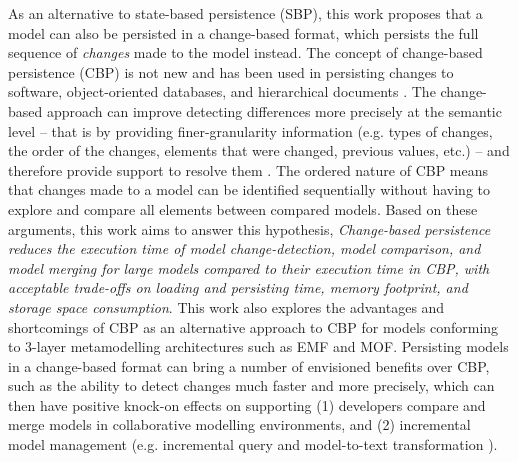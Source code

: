 \documentclass[sigplan,review,anonymous]{acmart}\settopmatter{printfolios=true,printccs=false,printacmref=false}
\begin{document}
As an alternative to state-based persistence (SBP), this work proposes that a model can also be persisted in a change-based format, which persists the full sequence of \emph{changes} made to the model instead. The concept of change-based persistence (CBP) is not new and has been used in persisting changes to software, object-oriented databases, and hierarchical documents \cite{DBLP:journals/entcs/RobbesL07,DBLP:conf/sde/LippeO92,DBLP:conf/caise/IgnatN05}. The change-based approach can improve detecting differences more precisely at the semantic level -- that is by providing finer-granularity information (e.g. types of changes, the order of the changes, elements that were changed, previous values, etc.) -- and therefore provide support to resolve them \cite{mens2002state}. The ordered nature of CBP means that changes made to a model can be identified sequentially without having to explore and compare all elements between compared models. Based on these arguments, this work aims to answer this hypothesis, \textit{Change-based persistence reduces the execution time of model change-detection, model comparison, and model merging for large models compared to their execution time in CBP, with acceptable trade-offs on loading and persisting time, memory footprint, and storage space consumption}. This work also explores the advantages and shortcomings of CBP as an alternative approach to CBP for models conforming to 3-layer metamodelling architectures such as EMF and MOF. Persisting models in a change-based format can bring a number of envisioned benefits over CBP, such as the ability to detect changes much faster and more precisely, which can then have positive knock-on effects on supporting (1) developers compare and merge models in collaborative modelling environments, and (2) incremental model management (e.g. incremental query \cite{DBLP:conf/ecmdafa/RathHV12} and model-to-text transformation \cite{DBLP:conf/ecmdafa/OgunyomiRK15}). 
\end{document}
